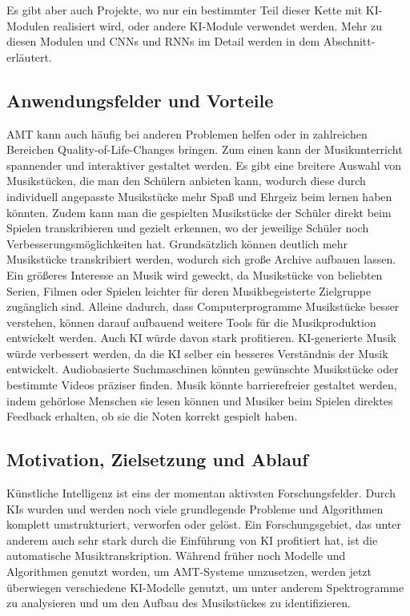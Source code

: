 Es gibt aber auch Projekte, wo nur ein bestimmter Teil dieser Kette mit KI-Modulen realisiert wird,
oder andere KI-Module verwendet werden.
Mehr zu diesen Modulen und CNNs und RNNs im Detail werden in dem Abschnitt- erläutert.

\subsection{Anwendungsfelder und Vorteile}\label{subsec:praktisch}
AMT kann auch häufig bei anderen Problemen helfen
oder in zahlreichen Bereichen Quality-of-Life-Changes bringen.
Zum einen kann der Musikunterricht spannender und interaktiver gestaltet werden.
Es gibt eine breitere Auswahl von Musikstücken, die man den Schülern anbieten kann,
wodurch diese durch individuell angepasste Musikstücke mehr Spaß und Ehrgeiz beim lernen haben könnten.
Zudem kann man die gespielten Musikstücke der Schüler direkt beim Spielen transkribieren und gezielt erkennen,
wo der jeweilige Schüler noch Verbesserungsmöglichkeiten hat.
Grundsätzlich können deutlich mehr Musikstücke transkribiert werden,
wodurch sich große Archive aufbauen lassen.
Ein größeres Interesse an Musik wird geweckt, da Musikstücke von beliebten Serien, Filmen oder Spielen
leichter für deren Musikbegeisterte Zielgruppe zugänglich sind.
Alleine dadurch, dass Computerprogramme Musikstücke besser verstehen,
können darauf aufbauend weitere Tools für die Musikproduktion entwickelt werden.
Auch KI würde davon stark profitieren.
KI-generierte Musik würde verbessert werden, da die KI selber ein besseres Verständnis der Musik entwickelt.
Audiobasierte Suchmaschinen könnten gewünschte Musikstücke oder bestimmte Videos präziser finden.
Musik könnte barrierefreier gestaltet werden,
indem gehörlose Menschen sie lesen können und Musiker beim Spielen direktes Feedback erhalten,
ob sie die Noten korrekt gespielt haben.

\subsection{Motivation, Zielsetzung und Ablauf}
Künstliche Intelligenz ist eins der momentan aktivsten Forschungsfelder.
Durch KIs wurden und werden noch viele grundlegende Probleme
und Algorithmen komplett umstrukturiert, verworfen oder gelöst.
Ein Forschungsgebiet, das unter anderem auch sehr stark durch die Einführung von KI profitiert hat,
ist die automatische Musiktranskription.
Während früher noch Modelle und Algorithmen genutzt worden, um AMT-Systeme umzusetzen,
werden jetzt überwiegen verschiedene KI-Modelle genutzt,
um unter anderem Spektrogramme zu analysieren und um den Aufbau des Musikstückes zu identifizieren.

